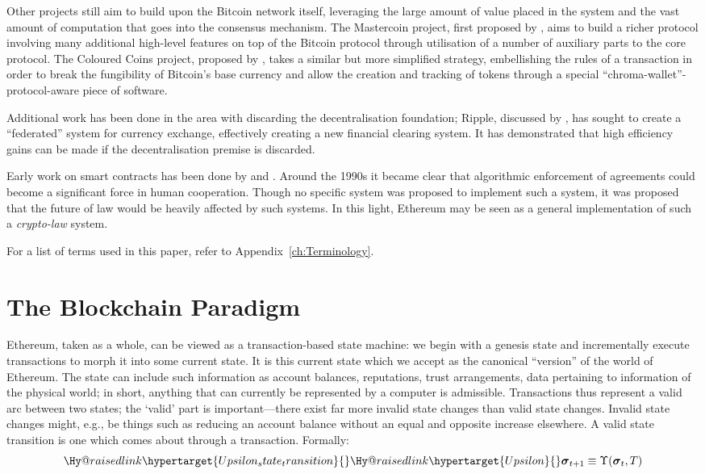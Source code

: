 \documentclass[9pt,oneside]{amsart}
\makeatletter
\newcommand{\linkdest}[1]{\Hy@raisedlink{\hypertarget{#1}{}}}
\newcommand*\eg{e.g.\@\xspace}
\makeatother
\begin{document}
\begin{multicols}{2}
Other projects still aim to build upon the Bitcoin network itself, leveraging the large amount of value placed in the system and the vast amount of computation that goes into the consensus mechanism. The Mastercoin project, first proposed by \cite{mastercoin2013willett}, aims to build a richer protocol involving many additional high-level features on top of the Bitcoin protocol through utilisation of a number of auxiliary parts to the core protocol. The Coloured Coins project, proposed by \cite{colouredcoins2012rosenfeld}, takes a similar but more simplified strategy, embellishing the rules of a transaction in order to break the fungibility of Bitcoin's base currency and allow the creation and tracking of tokens through a special ``chroma-wallet''-protocol-aware piece of software.

Additional work has been done in the area with discarding the decentralisation foundation; Ripple, discussed by \cite{boutellier2014pirates}, has sought to create a ``federated'' system for currency exchange, effectively creating a new financial clearing system. It has demonstrated that high efficiency gains can be made if the decentralisation premise is discarded.

Early work on smart contracts has been done by \cite{szabo1997formalizing} and \cite{miller1997future}. Around the 1990s it became clear that algorithmic enforcement of agreements could become a significant force in human cooperation. Though no specific system was proposed to implement such a system, it was proposed that the future of law would be heavily affected by such systems. In this light, Ethereum may be seen as a general implementation of such a \textit{crypto-law} system.

For a list of terms used in this paper, refer to Appendix~\ref{ch:Terminology}.

\section{The Blockchain Paradigm} \label{ch:overview}

Ethereum, taken as a whole, can be viewed as a transaction-based state machine: we begin with a genesis state and incrementally execute transactions to morph it into some current state. It is this current state which we accept as the canonical ``version'' of the world of Ethereum. The state can include such information as account balances, reputations, trust arrangements, data pertaining to information of the physical world; in short, anything that can currently be represented by a computer is admissible. Transactions thus represent a valid arc between two states; the `valid' part is important---there exist far more invalid state changes than valid state changes. Invalid state changes might, \eg, be things such as reducing an account balance without an equal and opposite increase elsewhere. A valid state transition is one which comes about through a transaction. Formally:
\begin{equation}
\linkdest{Upsilon_state_transition}\linkdest{Upsilon}\boldsymbol{\sigma}_{t+1} \equiv \Upsilon(\boldsymbol{\sigma}_{t}, T)
\end{equation}


\end{multicols}
\end{document}
